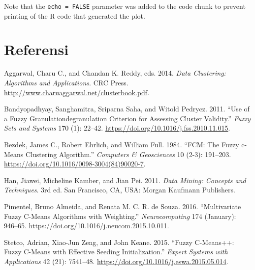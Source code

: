 \documentclass[
]{elegantbook}
\newlength{\cslhangindent}
\newlength{\cslentryspacingunit} %
\newenvironment{CSLReferences}[2] %
 {%
  \setlength{\parindent}{0pt}
  \ifodd #1
  \let\oldpar\par
  \def\par{\hangindent=\cslhangindent\oldpar}
  \fi
  \setlength{\parskip}{#2\cslentryspacingunit}
 }%
 {}
\begin{document}
Note that the \texttt{echo\ =\ FALSE} parameter was added to the code chunk to prevent printing of the R code that generated the plot.

\hypertarget{References}{%
\chapter*{Referensi}\label{References}}

\hypertarget{refs}{}
\begin{CSLReferences}{1}{0}
\leavevmode{}%
Aggarwal, Charu C., and Chandan K. Reddy, eds. 2014. \emph{Data Clustering: Algorithms and Applications}. CRC Press. \url{http://www.charuaggarwal.net/clusterbook.pdf}.

\leavevmode{}%
Bandyopadhyay, Sanghamitra, Sriparna Saha, and Witold Pedrycz. 2011. {``Use of a Fuzzy Granulation{\textendash}degranulation Criterion for Assessing Cluster Validity.''} \emph{Fuzzy Sets and Systems} 170 (1): 22--42. \url{https://doi.org/10.1016/j.fss.2010.11.015}.

\leavevmode{}%
Bezdek, James C., Robert Ehrlich, and William Full. 1984. {``FCM: The Fuzzy c-Means Clustering Algorithm.''} \emph{Computers \& Geosciences} 10 (2-3): 191--203. \url{https://doi.org/10.1016/0098-3004(84)90020-7}.

\leavevmode{}%
Han, Jiawei, Micheline Kamber, and Jian Pei. 2011. \emph{Data Mining: Concepts and Techniques}. 3rd ed. San Francisco, CA, USA: Morgan Kaufmann Publishers.

\leavevmode{}%
Pimentel, Bruno Almeida, and Renata M. C. R. de Souza. 2016. {``Multivariate Fuzzy C-Means Algorithms with Weighting.''} \emph{Neurocomputing} 174 (January): 946--65. \url{https://doi.org/10.1016/j.neucom.2015.10.011}.

\leavevmode{}%
Stetco, Adrian, Xiao-Jun Zeng, and John Keane. 2015. {``Fuzzy C-Means++: Fuzzy C-Means with Effective Seeding Initialization.''} \emph{Expert Systems with Applications} 42 (21): 7541--48. \url{https://doi.org/10.1016/j.eswa.2015.05.014}.

\end{CSLReferences}
\end{document}
